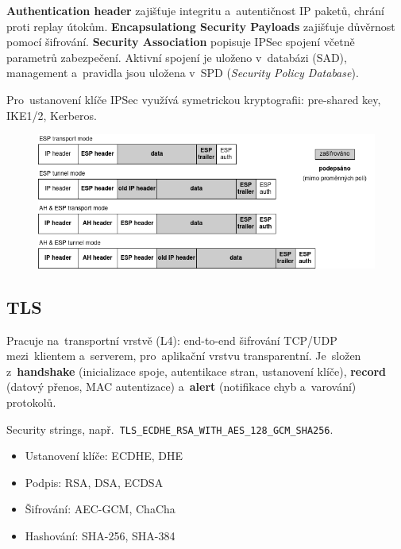 \textbf{Authentication header} zajišťuje integritu a~autentičnost IP paketů, chrání proti replay útokům. \textbf{Encapsulationg Security Payloads} zajišťuje důvěrnost pomocí šifrování. \textbf{Security Association} popisuje IPSec spojení včetně parametrů zabezpečení. Aktivní spojení je uloženo v~databázi (SAD), management a~pravidla jsou uložena v~SPD (\emph{Security Policy Database}).

Pro~ustanovení klíče IPSec využívá symetrickou kryptografii: pre-shared key, IKE1/2, Kerberos.

\begin{figure}[ht]
\centering
\includegraphics[width=\textwidth]{images/ipsec-modes}
\end{figure}

\clearpage
\subsection{TLS}

Pracuje na~transportní vrstvě (L4): end-to-end šifrování TCP/UDP mezi~klientem a~serverem, pro~aplikační vrstvu transparentní. Je~složen z~\textbf{handshake} (inicializace spoje, autentikace stran, ustanovení klíče), \textbf{record} (datový přenos, MAC autentizace) a~\textbf{alert} (notifikace chyb a~varování) protokolů.

Security strings, např.~\texttt{TLS\_ECDHE\_RSA\_WITH\_AES\_128\_GCM\_SHA256}.

\begin{itemize}[noitemsep]
\item Ustanovení klíče: ECDHE, DHE
\item Podpis: RSA, DSA, ECDSA
\item Šifrování: AEC-GCM, ChaCha
\item Hashování: SHA-256, SHA-384
\end{itemize}

